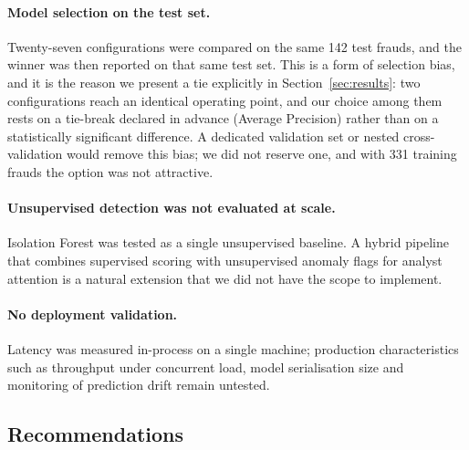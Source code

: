 \paragraph*{Model selection on the test set.} Twenty-seven configurations were
compared on the same 142 test frauds, and the winner was then reported on
that same test set. This is a form of selection bias, and it is the reason we
present a tie explicitly in Section~\ref{sec:results}: two configurations
reach an identical operating point, and our choice among them rests on a
tie-break declared in advance (Average Precision) rather than on a
statistically significant difference. A dedicated validation set or nested cross-validation would remove
this bias; we did not reserve one, and with 331 training frauds the option was
not attractive.

\paragraph*{Unsupervised detection was not evaluated at scale.} Isolation Forest
was tested as a single unsupervised baseline. A hybrid pipeline that combines
supervised scoring with unsupervised anomaly flags for analyst attention is a
natural extension that we did not have the scope to implement.

\paragraph*{No deployment validation.} Latency was measured in-process on a
single machine; production characteristics such as throughput under concurrent
load, model serialisation size and monitoring of prediction drift remain
untested.

\subsection{Recommendations}

